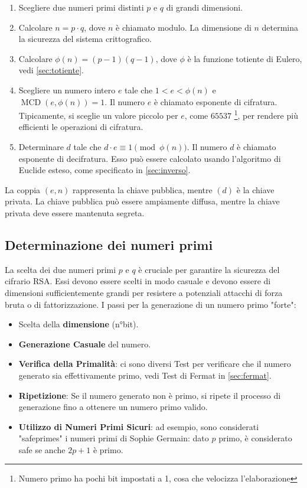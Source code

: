 \documentclass[a4paper,12pt]{report}
\begin{document}
\begin{enumerate}
    \item Scegliere due numeri primi distinti $p$ e $q$ di grandi dimensioni.
    \item Calcolare $n = p \cdot q$, dove $n$ è chiamato modulo. La dimensione di $n$ determina la sicurezza del sistema crittografico.
    \item Calcolare $\phi(n) = (p - 1)(q - 1)$, dove $\phi$ è la funzione totiente di Eulero, vedi \ref{sec:totiente}.
    \item Scegliere un numero intero $e$ tale che $1 < e < \phi(n)$ e $\operatorname{MCD}(e, \phi(n)) = 1$. Il numero $e$ è chiamato esponente di cifratura. Tipicamente, si sceglie un valore piccolo per $e$, come $65537$ \footnote{Numero primo ha pochi bit impostati a 1, cosa che velocizza l'elaborazione}, per rendere più efficienti le operazioni di cifratura.
    \item Determinare $d$ tale che $d \cdot e \equiv 1 \pmod{\phi(n)}$. Il numero $d$ è chiamato esponente di decifratura. Esso può essere calcolato usando l'algoritmo di Euclide esteso, come specificato in \ref{sec:inverso}.
\end{enumerate}

La coppia $(e, n)$ rappresenta la chiave pubblica, mentre $(d)$ è la chiave privata. La chiave pubblica può essere ampiamente diffusa, mentre la chiave privata deve essere mantenuta segreta.

\subsection*{Determinazione dei numeri primi}
La scelta dei due numeri primi $p$ e $q$ è cruciale per garantire la sicurezza del cifrario RSA. 
Essi devono essere scelti in modo casuale e devono essere di dimensioni sufficientemente grandi per resistere a potenziali attacchi di forza bruta o di fattorizzazione.
I passi per la generazione di un numero primo "forte":

\begin{itemize}
    \item{Scelta della \textbf{dimensione} (n°bit).}
    \item{\textbf{Generazione Casuale} del numero.} 
    \item{\textbf{Verifica della Primalità}: ci sono diversi Test per verificare che il numero generato sia effettivamente primo, vedi Test di Fermat in \ref{sec:fermat}.}
    \item{\textbf{Ripetizione}: Se il numero generato non è primo, si ripete il processo di generazione fino a ottenere un numero primo valido.}
    \item{\textbf{Utilizzo di Numeri Primi Sicuri}: ad esempio, sono considerati "safeprimes" i numeri primi di Sophie Germain: dato $p$ primo, è considerato safe se anche \(2p+1\) è primo. \cite{boneh2005}}
\end{itemize}
\end{document}
